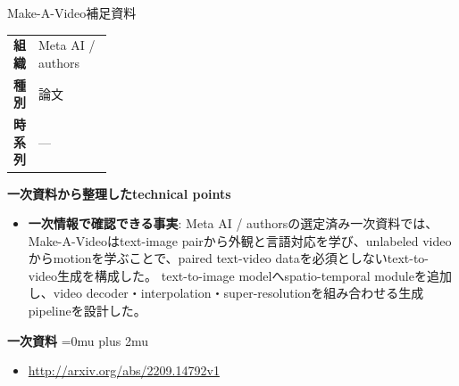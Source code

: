 \begin{technicalnote}{Make-A-Video}{補足資料}
\begingroup
\begin{tabularx}{\linewidth}{@{}>{\bfseries}p{0.22\linewidth}X@{}}
組織 & Meta AI / authors \\
種別 & 論文 \\
時系列 & — \\
\end{tabularx}
\smallskip
{\bfseries 一次資料から整理したtechnical points}
\begin{itemize}[leftmargin=1.5em,itemsep=0.35em]
\item \textbf{一次情報で確認できる事実}: Meta AI / authorsの選定済み一次資料では、Make-A-Videoはtext-image pairから外観と言語対応を学び、unlabeled videoからmotionを学ぶことで、paired text-video dataを必須としないtext-to-video生成を構成した。 text-to-image modelへspatio-temporal moduleを追加し、video decoder・interpolation・super-resolutionを組み合わせる生成pipelineを設計した。
\end{itemize}
\begin{minipage}{\linewidth}
\begin{samepage}
{\bfseries 一次資料}
\begingroup\sloppy
\Urlmuskip=0mu plus 2mu\relax
\begin{itemize}[leftmargin=1.5em,itemsep=0.25em]
\item {\scriptsize\url{http://arxiv.org/abs/2209.14792v1}}
\end{itemize}
\endgroup
\end{samepage}
\end{minipage}
\endgroup
\end{technicalnote}
\medskip

